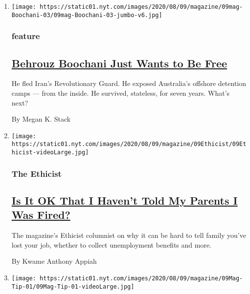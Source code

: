 \begin{enumerate}
\def\labelenumi{\arabic{enumi}.}
\item
  \texttt{[image: https://static01.nyt.com/images/2020/08/09/magazine/09mag-Boochani-03/09mag-Boochani-03-jumbo-v6.jpg]}

  \hypertarget{feature}{%
  \subsubsection{feature}\label{feature}}

  \hypertarget{behrouz-boochani-just-wants-to-be-free}{%
  \subsection{\texorpdfstring{\href{/2020/08/04/magazine/behrouz-boochani-australia.html}{Behrouz
  Boochani Just Wants to Be
  Free}}{Behrouz Boochani Just Wants to Be Free}}\label{behrouz-boochani-just-wants-to-be-free}}

  He fled Iran's Revolutionary Guard. He exposed Australia's offshore
  detention camps --- from the inside. He survived, stateless, for seven
  years. What's next?

  By Megan K. Stack
\item
  \texttt{[image: https://static01.nyt.com/images/2020/08/09/magazine/09Ethicist/09Ethicist-videoLarge.jpg]}

  \hypertarget{the-ethicist}{%
  \subsubsection{The Ethicist}\label{the-ethicist}}

  \hypertarget{is-it-ok-that-i-havent-told-my-parents-i-was-fired}{%
  \subsection{\texorpdfstring{\href{/2020/08/04/magazine/jobs-unemployment-ethics.html}{Is
  It OK That I Haven't Told My Parents I Was
  Fired?}}{Is It OK That I Haven't Told My Parents I Was Fired?}}\label{is-it-ok-that-i-havent-told-my-parents-i-was-fired}}

  The magazine's Ethicist columnist on why it can be hard to tell family
  you've lost your job, whether to collect unemployment benefits and
  more.

  By Kwame Anthony Appiah
\item
  \texttt{[image: https://static01.nyt.com/images/2020/08/09/magazine/09Mag-Tip-01/09Mag-Tip-01-videoLarge.jpg]}


\end{enumerate}
